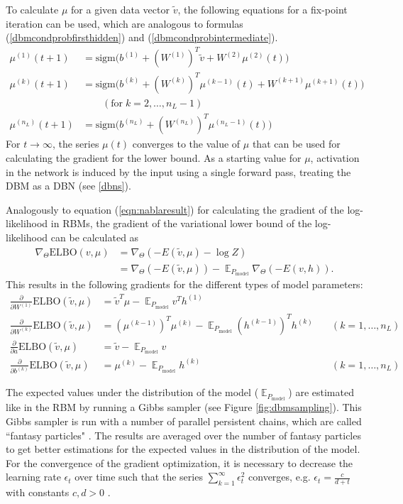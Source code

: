 \documentclass[12pt]{article}
\newcommand{\sigm}{\mathrm{sigm}}
\newcommand{\ELBO}{\mathrm{ELBO}}
\DeclareMathOperator{\EX}{\mathbb{E}}
\begin{document}
To calculate $\mu$ for a given data vector $\tilde{v}$, the following equations for a fix-point iteration can be used, which are analogous to formulas (\ref{dbmcondprobfirsthidden}) and (\ref{dbmcondprobintermediate}).
\begin{align*}
\mu^{(1)}(t+1)&= \sigm \bigg( b^{(1)} + (W^{(1)})^T \tilde{v} + W^{(2)} \mu ^{(2)}(t) \bigg) \\
\mu^{(k)}(t+1) &= \sigm \bigg( b^{(k)} + (W^{(k)})^T \mu^{(k-1)}(t) + W^{(k+1)} \mu^{(k+1)}(t) \bigg) \\
&\quad\quad (\text{for} \; k=2,\dots, n_L-1) \\
\mu^{(n_L)}(t+1)&= \sigm \bigg( b^{(n_L)} + (W^{(n_L)})^T \mu^{(n_L-1)}(t) \bigg)
\end{align*}
For  $t \rightarrow \infty$, the series $\mu(t)$ converges to the value of $\mu$ that can be used for calculating the gradient for the lower bound.
As a starting value for $\mu$, activation in the network is induced by the input using a single forward pass, treating the DBM as a DBN (see \ref{dbns}).

Analogously to equation (\ref{eqn:nablaresult}) for calculating the gradient of the log-likelihood in RBMs, the gradient of the variational lower bound of the log-likelihood can be calculated as
\begin{align*}
\nabla_{\Theta} \ELBO(v, \mu) &= \nabla_{\Theta} ( - E(\tilde{v}, \mu) - \log Z ) \\
 &= \nabla_{\Theta} (- E(\tilde{v}, \mu)) - \EX_{P_\text{model}} \nabla_{\Theta} (-E(v, h)).
\end{align*}
This results in the following gradients for the different types of model parameters:
\begin{align*}
\frac{\partial}{\partial W^{(1)}} \ELBO(\tilde{v}, \mu) &= \widetilde{v}^T \mu - \EX_{P_\text{model}} v^T h^{(1)} \\
\frac{\partial}{\partial W^{(k)}} \ELBO(\tilde{v}, \mu) &= (\mu^{(k-1)})^T \mu^{(k)}  - \EX_{P_\text{model}} (h^{(k-1)})^T h^{(k)} &\quad(k = 1, \dots, n_L)\\
\frac{\partial}{\partial a}  \ELBO(\tilde{v}, \mu) &=  \widetilde{v} - \EX_{P_\text{model}}  v \\
\frac{\partial}{\partial b^{(k)}}  \ELBO(\tilde{v}, \mu) &=  \mu^{(k)} - \EX_{P_\text{model}} h^{(k)}  &\quad ( k = 1, \dots, n_L)
\end{align*}

The expected values under the distribution of the model ($\EX_{P_\text{model}}$) are estimated like in the RBM by running a Gibbs sampler (see Figure \ref{fig:dbmsampling}).
This Gibbs sampler is run with a number of parallel persistent chains, which are called ``fantasy particles" \citep{salakhutdinov2009DBMs}. The results are averaged over the number of fantasy particles to get better estimations for the expected values in the distribution of the model.
For the convergence of the gradient optimization, it is necessary to decrease the learning rate $\epsilon_t$ over time such that the series $\sum_{k=1}^\infty \epsilon_t^2$ converges, e.g. $\epsilon_t = \frac{c}{d+t}$ with constants $c, d > 0$ \citep{sala2012anefficient}.
\end{document}
